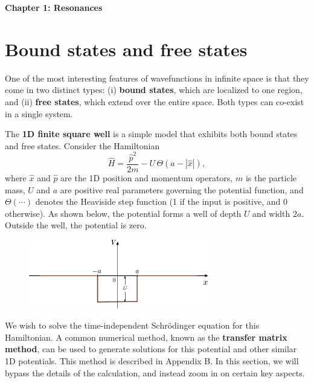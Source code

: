 \documentclass[pra,12pt]{revtex4}
\begin{document}
\begin{center}
{\Large \textbf{Chapter 1: Resonances}}
\end{center}

\section{Bound states and free states}

One of the most interesting features of wavefunctions in infinite
space is that they come in two distinct types: (i) \textbf{bound
  states}, which are localized to one region, and (ii) \textbf{free
  states}, which extend over the entire space.  Both types can
co-exist in a single system.

The \textbf{1D finite square well} is a simple model that exhibits
both bound states and free states.  Consider the Hamiltonian
\begin{equation}
  \hat{H} = \frac{\hat{p}^2}{2m} - U \,\Theta(a -|\hat{x}|),
\end{equation}
where $\hat{x}$ and $\hat{p}$ are the 1D position and momentum
operators, $m$ is the particle mass, $U$ and $a$ are positive real
parameters governing the potential function, and $\Theta(\cdots)$
denotes the Heaviside step function (1 if the input is positive, and 0
otherwise).  As shown below, the potential forms a well of depth $U$
and width $2a$.  Outside the well, the potential is zero.

\begin{figure}[h]
  \centering\includegraphics[width=0.7\textwidth]{squarewell}
\end{figure}

We wish to solve the time-independent Schr\"odinger equation for this
Hamiltonian.  A common numerical method, known as the \textbf{transfer
  matrix method}, can be used to generate solutions for this potential
and other similar 1D potentials.  This method is described in Appendix
B.  In this section, we will bypass the details of the calculation,
and instead zoom in on certain key aspects.
\end{document}
